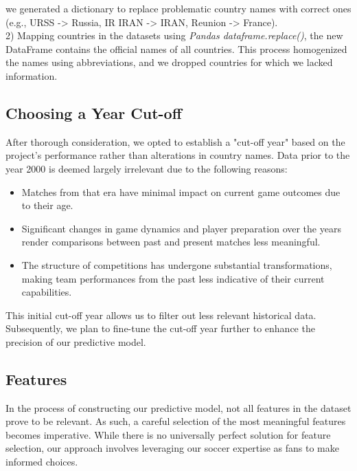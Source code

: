 \documentclass[a4paper,12pt]{article}
\begin{document}
we generated a dictionary to replace problematic country names with correct ones (e.g., URSS -> Russia, IR IRAN -> IRAN, Reunion -> France).\\

2) Mapping countries in the datasets using \textit{Pandas dataframe.replace()}, the new DataFrame contains the official names of all countries. This process homogenized the names using abbreviations, and we dropped countries for which we lacked information.

\subsection{Choosing a Year Cut-off}

After thorough consideration, we opted to establish a "cut-off year" based on the project's performance rather than alterations in country names. Data prior to the year 2000 is deemed largely irrelevant due to the following reasons:\\
\begin{itemize}
    \item Matches from that era have minimal impact on current game outcomes due to their age.
    \item Significant changes in game dynamics and player preparation over the years render comparisons between past and present matches less meaningful.
    \item The structure of competitions has undergone substantial transformations, making team performances from the past less indicative of their current capabilities.
\end{itemize}


This initial cut-off year allows us to filter out less relevant historical data. Subsequently, we plan to fine-tune the cut-off year further to enhance the precision of our predictive model.


\subsection{Features}

In the process of constructing our predictive model, not all features in the dataset prove to be relevant. As such, a careful selection of the most meaningful features becomes imperative. While there is no universally perfect solution for feature selection, our approach involves leveraging our soccer expertise as fans to make informed choices.\\
\end{document}
